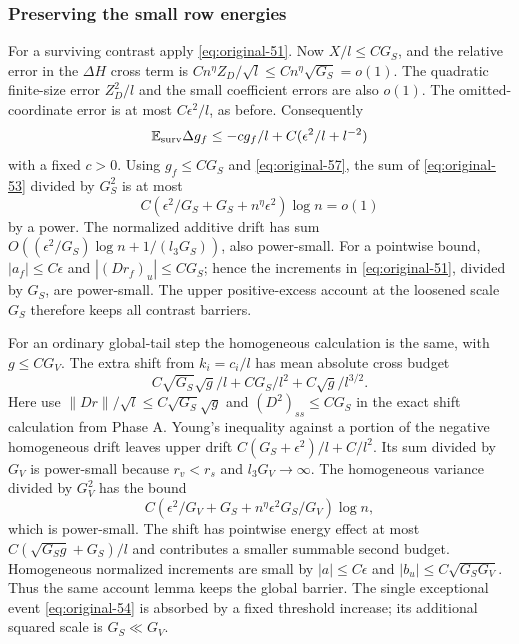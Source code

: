\subsubsection*{Preserving the small row energies}
For a surviving contrast apply \eqref{eq:original-51}.
Now $X/l\le CG_S$, and the relative error in the
$\Delta H$ cross term is
$Cn^\eta Z_D/\sqrt l\le Cn^\eta\sqrt{G_S}=o(1)$.
The quadratic finite-size error $Z_D^2/l$ and the small coefficient
errors are also $o(1)$.  The omitted-coordinate error is at most
$C\epsilon^2/l$, as before.  Consequently
\begin{equation}
 \mathbb E_{\rm surv}\Delta g_f
       \le-cg_f/l+C(\epsilon^2/l+l^{-2})
 \label{eq:original-58}
\end{equation}
with a fixed $c>0$.
Using $g_f\le CG_S$ and \eqref{eq:original-57}, the sum of
\eqref{eq:original-53} divided by $G_S^2$ is at most
\[
 C(\epsilon^2/G_S+G_S+n^\eta\epsilon^2)\log n=o(1)
\]
by a power.  The normalized additive drift has sum
$O((\epsilon^2/G_S)\log n+1/(l_3G_S))$, also power-small.
For a pointwise bound,
$|a_f|\le C\epsilon$ and
$|(Dr_f)_u|\le C G_S$; hence the increments in
\eqref{eq:original-51}, divided by $G_S$, are power-small.
The upper positive-excess account at the loosened scale $G_S$
therefore keeps all contrast barriers.

For an ordinary global-tail step the homogeneous calculation is
the same, with $g\le CG_V$.  The extra shift from $k_i=c_i/l$
has mean absolute cross budget
\[
 C\sqrt{G_S}\sqrt g/l+CG_S/l^2+C\sqrt g/l^{3/2}.
\]
Here use $\|Dr\|/\sqrt l\le C\sqrt{G_S}\sqrt g$ and
$(D^2)_{ss}\le CG_S$ in the exact shift calculation from Phase A.
Young's inequality against a portion of the negative homogeneous
drift leaves upper drift
$C(G_S+\epsilon^2)/l+C/l^2$.
Its sum divided by $G_V$ is power-small because
$r_v<r_s$ and $l_3G_V\longrightarrow\infty$.
The homogeneous variance divided by $G_V^2$ has the bound
\[
 C(\epsilon^2/G_V+G_S+n^\eta\epsilon^2G_S/G_V)\log n,
\]
which is power-small.  The shift has pointwise energy effect at
most $C(\sqrt{G_Sg}+G_S)/l$ and contributes a smaller summable
second budget.  Homogeneous normalized increments are small by
$|a|\le C\epsilon$ and
$|b_u|\le C\sqrt{G_SG_V}$.
Thus the same account lemma keeps the global barrier.  The single
exceptional event \eqref{eq:original-54} is absorbed by a fixed
threshold increase; its additional squared scale is $G_S\ll G_V$.

